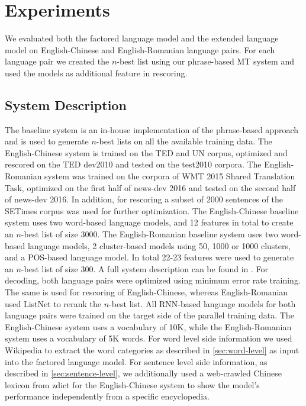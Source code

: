 \documentclass[a4paper]{article}
\begin{document}
\section{Experiments}
We evaluated both the factored language model and the extended language model on English-Chinese and English-Romanian language pairs. For each language pair we created the $n$-best list using our phrase-based MT system and used the models as additional feature in rescoring.

\subsection{System Description}
The baseline system is an in-house implementation of the phrase-based approach and is used to generate $n$-best lists on all the available training data. The English-Chinese system is trained on the TED and UN corpus, optimized and rescored on the TED dev2010 and tested on the test2010 corpora.
The English-Romanian system was trained on the corpora of WMT 2015 Shared Translation Task, optimized on the first half of news-dev 2016 and tested on the second half of news-dev 2016. In addition, for rescoring a subset of 2000 sentences of the SETimes corpus was used for further optimization.
The English-Chinese baseline system uses two word-based language models, and 12 features in total to create an $n$-best list of size 3000.
The English-Romanian baseline system uses two word-based language models, 2 cluster-based models using 50, 1000 or 1000 clusters, and a POS-based language model. In total 22-23 features were used to generate an $n$-best list of size 300. A full system description can be found in \cite{niehuesusing}.
For decoding, both language pairs were optimized using minimum error rate training. The same is used for rescoring of English-Chinese, whereas English-Romanian used ListNet to rerank the $n$-best list.
All RNN-based language models for both language pairs were trained on the target side of the parallel training data. The English-Chinese system uses a vocabulary of 10K, while the English-Romanian system uses a vocabulary of 5K words. For word level side information we used Wikipedia to extract the word categories as described in \ref{sec:word-level} as input into the factored language model.
For sentence level side information, as described in \ref{sec:sentence-level}, we additionally used a web-crawled Chinese lexicon from zdict for the English-Chinese system to show the model's performance independently from a specific encyclopedia.
\end{document}

